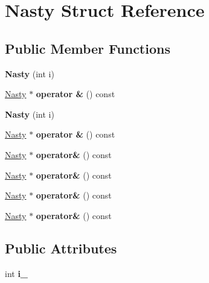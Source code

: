 \hypertarget{struct_nasty}{}\section{Nasty Struct Reference}
\label{struct_nasty}
\subsection*{Public Member Functions}
\begin{DoxyCompactItemize}
\item 
\mbox{\label{struct_nasty_a72980c7e32267c287ba2638ccf433da9}} 
{\bfseries Nasty} (int i)
\item 
\mbox{\label{struct_nasty_a61c4eaaf2aff80c7d936a6e558606f90}} 
\mbox{\hyperlink{struct_nasty}{Nasty}} $\ast$ {\bfseries operator \&} () const
\item 
\mbox{\label{struct_nasty_a72980c7e32267c287ba2638ccf433da9}} 
{\bfseries Nasty} (int i)
\item 
\mbox{\label{struct_nasty_a61c4eaaf2aff80c7d936a6e558606f90}} 
\mbox{\hyperlink{struct_nasty}{Nasty}} $\ast$ {\bfseries operator \&} () const
\item 
\mbox{\label{struct_nasty_a19a829934ffadcb60dd12086ba438867}} 
\mbox{\hyperlink{struct_nasty}{Nasty}} $\ast$ {\bfseries operator\&} () const
\item 
\mbox{\label{struct_nasty_a19a829934ffadcb60dd12086ba438867}} 
\mbox{\hyperlink{struct_nasty}{Nasty}} $\ast$ {\bfseries operator\&} () const
\item 
\mbox{\label{struct_nasty_a19a829934ffadcb60dd12086ba438867}} 
\mbox{\hyperlink{struct_nasty}{Nasty}} $\ast$ {\bfseries operator\&} () const
\item 
\mbox{\label{struct_nasty_a19a829934ffadcb60dd12086ba438867}} 
\mbox{\hyperlink{struct_nasty}{Nasty}} $\ast$ {\bfseries operator\&} () const
\end{DoxyCompactItemize}
\subsection*{Public Attributes}
\begin{DoxyCompactItemize}
\item 
\mbox{\label{struct_nasty_abfcf4ba99cc9530aa79e501502f1dfdd}} 
int {\bfseries i\+\_\+}
\end{DoxyCompactItemize}
